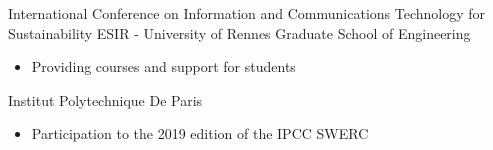 {International Conference on Information and Communications Technology for Sustainability}{}
{}
{ESIR - University of Rennes Graduate School of Engineering }{}
{\begin{itemize}
    \item Providing courses and support for students
\end{itemize}}
{Institut Polytechnique De Paris }{}
{\begin{itemize}
    \item Participation to the 2019 edition of the IPCC SWERC
\end{itemize}}